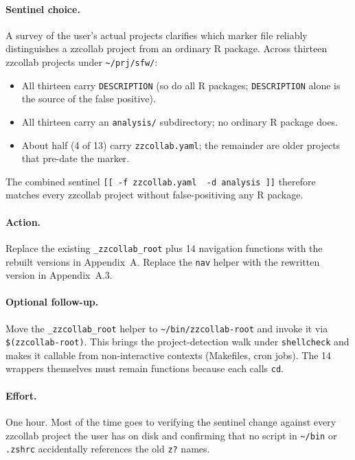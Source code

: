 \documentclass[11pt,letterpaper]{scrartcl}
\begin{document}
\paragraph{Sentinel choice.} A survey of the user's actual
projects clarifies which marker file reliably distinguishes a
zzcollab project from an ordinary R package. Across thirteen
zzcollab projects under \texttt{\textasciitilde/prj/sfw/}:

\begin{itemize}
  \item All thirteen carry \texttt{DESCRIPTION} (so do all R
        packages; \texttt{DESCRIPTION} alone is the source of the
        false positive).
  \item All thirteen carry an \texttt{analysis/} subdirectory; no
        ordinary R package does.
  \item About half (4 of 13) carry \texttt{zzcollab.yaml}; the
        remainder are older projects that pre-date the marker.
\end{itemize}

The combined sentinel \texttt{[[ -f zzcollab.yaml \textbar\textbar
\ -d analysis ]]} therefore matches every zzcollab project
without false-positiving any R package.

\paragraph{Action.} Replace the existing \texttt{\_zzcollab\_root}
plus 14 navigation functions with the rebuilt versions in
Appendix~A. Replace the \texttt{nav} helper with the rewritten
version in Appendix~A.3.

\paragraph{Optional follow-up.} Move the \texttt{\_zzcollab\_root}
helper to \texttt{\textasciitilde/bin/zzcollab-root} and invoke
it via \texttt{\$(zzcollab-root)}. This brings the
project-detection walk under \texttt{shellcheck} and makes it
callable from non-interactive contexts (Makefiles, cron jobs).
The 14 wrappers themselves must remain functions because each
calls \texttt{cd}.

\paragraph{Effort.} One hour. Most of the time goes to verifying
the sentinel change against every zzcollab project the user has
on disk and confirming that no script in
\texttt{\textasciitilde/bin} or \texttt{.zshrc} accidentally
references the old \texttt{z?} names.
\end{document}
